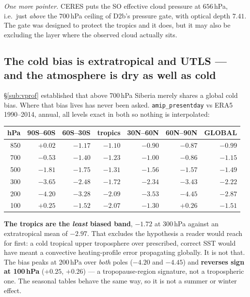 \documentclass[10pt]{article}
\begin{document}
\emph{One more pointer.} CERES puts the SO effective cloud pressure at $656$\,hPa, i.e.\
just \emph{above} the $700$\,hPa ceiling of D2b's pressure gate, with optical depth
$7.41$. The gate was designed to protect the tropics and it does, but it may also be
excluding the layer where the observed cloud actually sits.

\subsection{The cold bias is extratropical and UTLS --- and the atmosphere is dry as well
as cold}\label{sub:utls}
\S\ref{sub:vprof} established that above 700\,hPa Siberia merely shares a global cold
bias. Where that bias lives has never been asked. \texttt{amip\_presentday} vs ERA5
1990--2014, annual, all levels exact in both so nothing is interpolated:

\begin{center}\footnotesize
\begin{tabular}{r r r r r r r}
\toprule
hPa & 90S--60S & 60S--30S & \textbf{tropics} & 30N--60N & 60N--90N & GLOBAL \\
\midrule
 850 & $+0.02$ & $-1.17$ & $-1.10$ & $-0.90$ & $-0.87$ & $-0.99$ \\
 700 & $-0.53$ & $-1.40$ & $-1.23$ & $-1.00$ & $-0.86$ & $-1.15$ \\
 500 & $-1.81$ & $-1.75$ & $-1.31$ & $-1.56$ & $-1.57$ & $-1.49$ \\
 300 & $\mathbf{-3.65}$ & $-2.48$ & $\mathbf{-1.72}$ & $-2.34$ & $\mathbf{-3.43}$ & $-2.22$ \\
 200 & $\mathbf{-4.20}$ & $-3.28$ & $\mathbf{-2.09}$ & $-3.53$ & $\mathbf{-4.45}$ & $-2.87$ \\
 100 & $+0.25$ & $-1.52$ & $-2.07$ & $-1.30$ & $+0.26$ & $-1.51$ \\
\bottomrule
\end{tabular}
\end{center}

\noindent \textbf{The tropics are the \emph{least} biased band}, $-1.72$ at 300\,hPa
against an extratropical mean of $-2.97$. That excludes the hypothesis a reader would
reach for first: a cold tropical upper troposphere over prescribed, correct SST would
have meant a convective heating-profile error propagating globally. It is not that. The
bias peaks at 200\,hPa over \emph{both} poles ($-4.20$ and $-4.45$) and \textbf{reverses
sign at 100\,hPa} ($+0.25$, $+0.26$) --- a tropopause-region signature, not a tropospheric
one. The seasonal tables behave the same way, so it is not a summer or winter effect.
\end{document}
